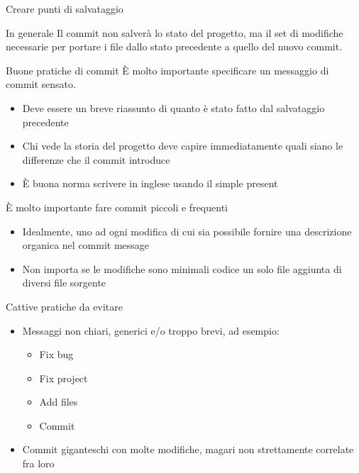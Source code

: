 \documentclass[xcolor=dvipsnames,presentation]{beamer}
\begin{document}
\begin{frame}{Creare punti di salvataggio}
\begin{block}{In generale}
		Il commit non salverà lo stato del progetto, ma il set di modifiche necessarie per portare i
file dallo stato precedente a quello del nuovo commit.
	\end{block}
	\begin{block}{Buone pratiche di commit}
		È molto importante specificare un messaggio di commit sensato.
		\begin{itemize}
			\item Deve essere un breve riassunto di quanto è stato fatto dal salvataggio precedente
			\item Chi vede la storia del progetto deve capire immediatamente quali siano le
differenze che il commit introduce
			\item È buona norma scrivere in inglese usando il simple present
		\end{itemize}
		È molto importante fare commit piccoli e frequenti
		\begin{itemize}
			\item Idealmente, uno ad ogni modifica di cui sia possibile fornire una descrizione
organica nel commit message
			\item Non importa se le modifiche sono minimali
codice
un solo file
aggiunta di diversi file sorgente
		\end{itemize}
	\end{block}
	\begin{block}{Cattive pratiche da evitare}
		\begin{itemize}
			\item Messaggi non chiari, generici e/o troppo brevi, ad esempio:
			\begin{itemize}
				\item Fix bug
				\item Fix project
				\item Add files
				\item Commit
			\end{itemize}
			\item Commit giganteschi con molte modifiche, magari non strettamente correlate fra loro

\end{itemize}
\end{block}
\end{frame}
\end{document}
